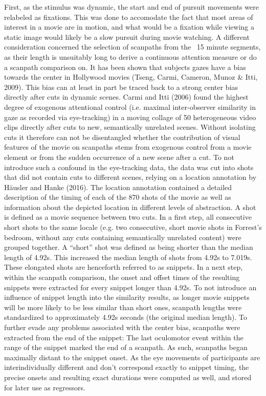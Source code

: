 \documentclass[a4paper, 11pt]{scrreprt}
\begin{document}
First, as the stimulus was dynamic, the start and end of pursuit movements were relabeled as fixations. This was done to accomodate the fact that most areas of interest in a movie are in motion, and what would be a fixation while viewing a static image would likely be a slow pursuit during movie watching. A different consideration concerned the selection of scanpaths from the ~15 minute segments, as their length is unsuitably long to derive a continuous attention measure or do a scanpath comparison on. It has been shown that subjects gazes have a bias towards the center in Hollywood movies (Tseng, Carmi, Cameron, Munoz \& Itti, 2009). This bias can at least in part be traced back to a strong center bias directly after cuts in dynamic scenes. Carmi and Itti (2006) found the highest degree of exogenous attentional control (i.e. maximal inter-observer similarity in gaze as recorded via eye-tracking) in a moving collage of 50 heterogeneous video clips directly after cuts to new, semantically unrelated scenes. Without isolating cuts it therefore can not be disentangled whether the contribution of visual features of the movie on scanpaths stems from exogenous control from a movie element or from the sudden occurrence of a new scene after a cut. To not introduce such a confound in the eye-tracking data, the data was cut into shots that did not contain cuts to different scenes, relying on a location annotation by Häusler and Hanke (2016). The location annotation contained a detailed description of the timing of each of the 870 shots of the movie as well as information about the depicted location in different levels of abstraction. A shot is defined as a movie sequence between two cuts. In a first step, all consecutive short shots to the same locale (e.g. two consecutive, short movie shots in Forrest's bedroom, without any cuts containing semantically unrelated content) were grouped together. A “short” shot was defined as being shorter than the median length of 4.92s. This increased the median length of shots from 4.92s to 7.019s. These elongated shots are henceforth referred to as snippets. In a next step, within the scanpath comparison, the onset and offset times of the resulting snippets were extracted for every snippet longer than 4.92s. To not introduce an influence of snippet length into the similarity results, as longer movie snippets will be more likely to be less similar than short ones, scanpath lengths were standardized to approximately 4.92s seconds (the original median length). To further evade any problems associated with the center bias, scanpaths were extracted from the end of the snippet: The last oculomotor event within the range of the snippet marked the end of a scanpath. As such, scanpaths began maximally distant to the snippet onset.
As the eye movements of participants are interindividually different and don't correspond exactly to snippet timing, the precise onsets and resulting exact durations were computed as well, and stored for later use as regressors.
\end{document}
